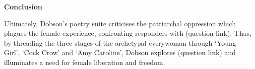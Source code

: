 	\textbf{Conclusion}

	Ultimately, Dobson's poetry suite criticises the patriarchal oppression which plagues the female experience, confronting responders with (question link). Thus, by threading the three stages of the archetypal everywoman through ‘Young Girl’, ‘Cock Crow’ and ‘Amy Caroline’, Dobson explores (question link) and illuminates a need for female liberation and freedom.


